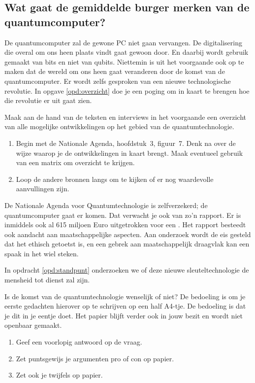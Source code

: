 \documentclass[../../main.tex]{subfiles}
\begin{document}
\subsection*{Wat gaat de gemiddelde burger merken van de quantumcomputer?}  
De quantumcomputer zal de gewone PC niet gaan vervangen. De digitalisering die overal om ons heen plaats vindt gaat gewoon door. En daarbij wordt gebruik gemaakt van bits en niet van qubits. Niettemin is uit het voorgaande ook op te maken dat de wereld om ons heen gaat veranderen door de komst van de quantumcomputer. Er wordt zelfs gesproken van een nieuwe technologische revolutie. In opgave \ref{opd:overzicht} doe je een poging om in kaart te brengen hoe die revolutie er uit gaat zien.



\begin{opdracht}\label{opd:overzicht}
Maak aan de hand van de teksten en interviews in het voorgaande een overzicht van alle mogelijke ontwikkelingen op het gebied van de quantumtechnologie.
\begin{enumerate}
\item Begin met de Nationale Agenda, hoofdstuk~3, figuur~7. Denk na over de wijze waarop je de ontwikkelingen in kaart brengt. Maak eventueel gebruik van een matrix om overzicht te krijgen.
\item Loop de andere bronnen langs om te kijken of er nog waardevolle aanvullingen zijn. 
\end{enumerate}
\end{opdracht}

De Nationale Agenda voor Quantumtechnologie is zelfverzekerd; de quantumcomputer gaat er komen. Dat verwacht je ook  van zo'n rapport. Er is inmiddels ook al 615 miljoen Euro uitgetrokken voor een  
.
Het rapport besteedt ook aandacht aan maatschappelijke aspecten. Aan onderzoek wordt de eis gesteld dat het ethisch getoetst is, en een gebrek aan maatschappelijk draagvlak kan een spaak in het wiel steken.

In opdracht \ref{opd:standpunt} onderzoeken we of deze nieuwe sleuteltechnologie de mensheid tot dienst zal zijn.  

\begin{opdracht}\label{opd:standpunt}
Is de komst van de quantumtechnologie wenselijk of niet? De bedoeling is om je eerste gedachten  hierover op te schrijven op een half A4-tje. De bedoeling is dat je dit in je eentje doet. Het papier blijft verder ook in jouw bezit en wordt niet openbaar gemaakt.
\begin{enumerate}
\item Geef een voorlopig antwoord op de vraag. 
\item Zet puntsgewijs je argumenten pro of con op papier.
\item Zet ook je twijfels op papier.
\end{enumerate}
\end{opdracht}
\end{document}
